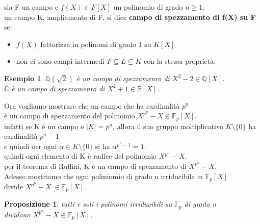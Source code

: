 \documentclass[a4paper,12pt]{article}
\theoremstyle{def}
\theoremstyle{prop}
\newtheorem*{proposition}{Proposizione}
\theoremstyle{esempio}
\newtheorem*{example}{Esempio}
\theoremstyle{dimostrazione}
\theoremstyle{teo}
\theoremstyle{osservazione}
\begin{document}
sia F un campo e \(f(X) \in F[X]\) un polinomio di grado \(n \geq 1\).\\
un campo K, ampliamento di F, si dice \textbf{campo di spezzamento di f(X) su F} se:\\
\begin{itemize}
	\item \(f(X)\) fattorizza in polinomi di grado 1 su \(K[X]\)
	\item non ci sono campi intermedi \(F \subseteq L \subsetneq K\) con la stessa proprietà.
\end{itemize}

\begin{example}
	\(\mathbb{Q}(\sqrt{2})\) è un campo di spezzamenro di \(X^2 - 2 \in \mathbb{Q}[X]\).\\
	\(\mathbb{C}\) è un campo di spezzamenro di \(X^2 + 1 \in \mathbb{R}[X]\).\\
\end{example}

\newpage

Ora vogliamo mostrare che un campo che ha cardinalità \(p^n\)\\
è un campo di spezzamento del polinomio \(X^{p^n} - X \in \mathbb{F}_p[X]\).\\
infatti se K è un campo e \(|K| = p^n\), allora il suo gruppo moltiplicativo \(K \setminus \{0\}\) ha cardinalità \(p^n - 1\)\\
e quindi oer ogni \(\alpha \in K \setminus \{0\}\) si ha \(\alpha^{p^n - 1} = 1\).\\
quindi ogni elemento di K è radice del polinomio \(X^{p^n} - X\).\\
per il teorema di Ruffini, K è un campo di spezzamento di \(X^{p^n} - X\).\\
Adesso mostriamo che ogni poliniomio di grado n irriducibile in \(\mathbb{F}_p[X]\)\\
divide \(X^{p^n} - X\ \in \mathbb{F}_p[X]\).\\

\begin{proposition}
	tutti e soli i polinomi irriducibili su \(\mathbb{F}_p\) di grado n\\
	dividono \(X^{p^n} - X \in \mathbb{F}_p[X]\).
\end{proposition}
\end{document}
